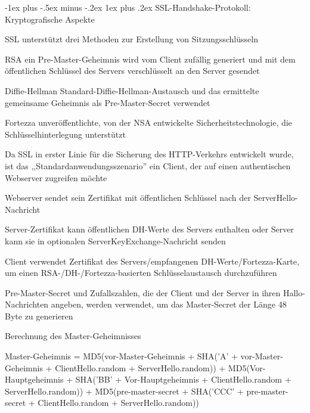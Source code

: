 \documentclass[a4paper]{article}
\makeatletter
\renewcommand{\subsubsection}{\@startsection{subsubsection}{3}{0mm}%
 {-1ex plus -.5ex minus -.2ex}%
 {1ex plus .2ex}%
 {\normalfont\small\bfseries}}
\makeatother
\begin{document}
\begin{multicols}{3}
      \subsubsection{SSL-Handshake-Protokoll: Kryptografische Aspekte}
      \begin{itemize*}
            \item SSL unterstützt drei Methoden zur Erstellung von Sitzungsschlüsseln
            \begin{description*}
                  \item[RSA] ein Pre-Master-Geheimnis wird vom Client zufällig generiert und mit dem öffentlichen Schlüssel des Servers verschlüsselt an den Server gesendet
                  \item[Diffie-Hellman] Standard-Diffie-Hellman-Austausch und das ermittelte gemeinsame Geheimnis als Pre-Master-Secret verwendet
                  \item[Fortezza] unveröffentlichte, von der NSA entwickelte Sicherheitstechnologie, die Schlüsselhinterlegung unterstützt %
            \end{description*}
            \item Da SSL in erster Linie für die Sicherung des HTTP-Verkehrs entwickelt wurde, ist das ,,Standardanwendungsszenario'' ein Client, der auf einen authentischen Webserver zugreifen möchte
            \begin{itemize*}
                  \item Webserver sendet sein Zertifikat mit öffentlichen Schlüssel nach der ServerHello-Nachricht
                  \item Server-Zertifikat kann öffentlichen DH-Werte des Servers enthalten oder Server kann sie in optionalen ServerKeyExchange-Nachricht senden
                  \item Client verwendet Zertifikat des Servers/empfangenen DH-Werte/Fortezza-Karte, um einen RSA-/DH-/Fortezza-basierten Schlüsselaustausch durchzuführen
            \end{itemize*}
            \item Pre-Master-Secret und Zufallszahlen, die der Client und der Server in ihren Hallo-Nachrichten angeben, werden verwendet, um das Master-Secret der Länge 48 Byte zu generieren
            \item Berechnung des Master-Geheimnisses
            \begin{itemize*}
                  \item Master-Geheimnis = MD5(vor-Master-Geheimnis + SHA('A' + vor-Master-Geheimnis + ClientHello.random + ServerHello.random)) + MD5(Vor-Hauptgeheimnis + SHA('BB' + Vor-Hauptgeheimnis + ClientHello.random + ServerHello.random)) + MD5(pre-master-secret + SHA('CCC' + pre-master-secret + ClientHello.random + ServerHello.random))

\end{itemize*}
\end{itemize*}
\end{multicols}
\end{document}
